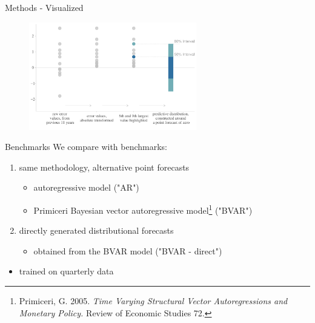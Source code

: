 \documentclass[en]{sdqbeamer}
\begin{document}
\begin{frame}{Methods - Visualized}
\begin{figure}
        \centering
        \includegraphics[width=0.65\textwidth]{figures/illustration_quantileextraction.pdf} 
        \label{fig:enter-label}
    \end{figure} 
\end{frame}

\begin{frame}{Benchmarks}
    We compare with benchmarks:
\begin{enumerate}
    \item same methodology, alternative point forecasts
    \begin{itemize}
        \item autoregressive model ("AR")
        \item Primiceri Bayesian vector autoregressive model\footnote{Primiceri, G. 2005. \textit{Time Varying Structural Vector Autoregressions and Monetary Policy.} Review of Economic Studies 72.} ("BVAR")
    \end{itemize}
    \item directly generated distributional forecasts
    \begin{itemize}
        \item obtained from the BVAR model ("BVAR - direct")
    \end{itemize}
\end{enumerate}
\begin{itemize}
    \item trained on quarterly data
\end{itemize}

\end{frame}
\end{document}
